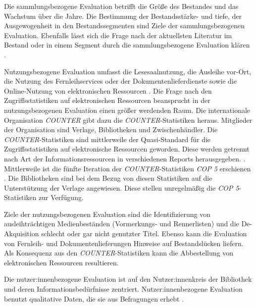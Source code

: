 Die sammlungsbezogene Evaluation betrifft die Größe des Bestandes und das Wachstum über die Jahre. Die Bestimmung der Bestandsstärke- und tiefe, 
der Ausgewogenheit in den Bestandssegmenten sind Ziele der sammlungsbezogenen Evaluation. 
Ebenfalls lässt sich die Frage nach der aktuellsten Literatur im Bestand oder in einem Segment durch die sammlungsbezogene Evaluation klären
\cite[vgl.][48 f.]{lyons_lucy_eleonore_collection_2010}.

Nutzungsbezogene Evaluation umfasst die Lesesaalnutzung, die Ausleihe vor-Ort, die Nutzung des Fernleihservices oder der Dokumentenlieferdienste sowie die Online-Nutzung von elektronischen Ressourcen \cite[vgl.][254 ff.]{johannsen_jochen_bestands-_2015}.
Die Frage nach den Zugriffsstatistiken auf elektronischen Ressourcen beansprucht in der nutzungsbezogenen Evaluation einen größer werdenden Raum.
Die internationale Organisation \textit{\acrfull{COUNTER}} gibt dazu die \textit{\acrshort{COUNTER}}-Statistiken heraus. Mitglieder der Organisation sind Verlage, Bibliotheken
und Zwischenhändler. Die \textit{\acrshort{COUNTER}}-Statistiken sind mittlerweile der Quasi-Standard für die Zugriffsstatistiken 
auf elektronische Ressourcen geworden. Diese werden getrennt nach Art der Informationsressourcen in verschiedenen Reports herausgegeben. \cite[vgl.][260 ff.]{johannsen_jochen_bestands-_2015}. 
Mittlerweile ist die fünfte Iteration der \textit{\acrshort{COUNTER}}-Statistiken \textit{\acrshort{COP 5}} erschienen \cite[vgl.][]{counter_abstract_2020}.
Die Bibliotheken sind bei dem Bezug von diesen Statistiken auf die Unterstützung der Verlage angewiesen. Diese stellen unregelmäßig die \textit{\acrshort{COP 5}}-Statistiken zur
Verfügung. 

Ziele der nutzungsbezogenen Evaluation sind die Identifizierung von ausleihträchtigen Medienbeständen (Vormerkungs- und Rennerlisten) und
die De-Akquisition schlecht oder gar nicht genutzter Titel. Ebenso kann die Evaluation von Fernleih- und Dokumentenlieferungen Hinweise auf Bestandslücken liefern.
Als Konsequenz aus den \textit{\acrshort{COUNTER}}-Statistiken kann die Abbestellung von elektronischen Ressourcen resultieren.

Die nutzer:innenbezogene Evaluation ist auf den Nutzer:innenkreis der Bibliothek und deren Informationsbedürfnisse zentriert. 
Nutzer:innenbezogene Evaluation benutzt qualitative Daten, die sie aus Befragungen erhebt
\cites[vgl.][255 ff.]{johannsen_jochen_bestands-_2015}[vgl.][302]{johnson_peggy_fundamentals_2014}.

